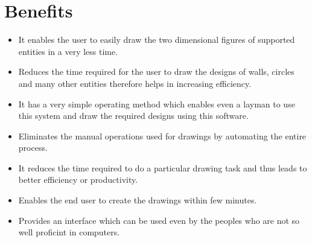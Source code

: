 \section{Benefits}
\begin{itemize}
\item It enables the user to easily draw the two dimensional figures of supported entities  in a very less time.
\item Reduces the time required for the user to draw the designs of walls, circles and many other entities therefore helps in increasing efficiency.
\item It has a very simple operating method which enables even a layman to use this system and draw the required designs using this software.
\item Eliminates the manual operations used for drawings by automating the entire process.
\item It reduces the time required to do a particular drawing task and thus leads to better efficiency or productivity.
\item Enables the end user to create the drawings within few minutes.
\item Provides an interface which can be used even by the peoples who are not so well proficint in computers.
\end{itemize} 

